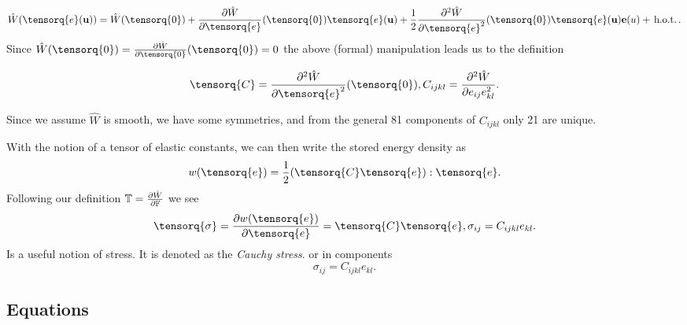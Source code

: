 \documentclass[reqno, a4paper]{article}
\begin{document}
\[
	\hat{W}\qty(\tensorq{e}\qty(\vb{u}))= \hat{W}\qty(\tensorq{0})+ \pdv{\hat{W}}{\tensorq{e}}\qty(\tensorq{0})\tensorq{e}\qty(\vb{u})+\frac{1}{2}\pdv[2]{\hat{W}}{\tensorq{e}}\qty(\tensorq{0})\tensorq{e}\qty(\vb{u}) \vb{e}\qty(u) + \, \text{h.o.t.} \,.
\]
Since $\hat{W}\qty(\tensorq{0}) = \pdv{\hat{W}}{\tensorq{0}}\qty(\tensorq{0}) = 0$ the above (formal) manipulation leads us to the definition
\begin{definition}
	\[
		\tensorq{C} = \pdv[2]{\hat{W}}{\tensorq{e}}\qty(\tensorq{0}), C_{ijkl} = \pdv[2]{\hat{W}}{e_{ij}e_{kl}}.
	\]
\end{definition}
\begin{remark}
    Since we assume $\hat{W}$ is smooth, we have some symmetries, and from the general 81 components of $C_{ijkl}$ only 21 are unique.
\end{remark}

With the notion of a tensor of elastic constants, we can then write the stored energy density as
\[
	w\qty(\tensorq{e}) = \frac{1}{2}(\tensorq{C}\tensorq{e}):\tensorq{e}.
\]
Following our definition $\mathbb{T} = \pdv{\hat{W}}{\ensuremath{\mathbb{F}}}$ we see
\[
	\tensorq{\sigma} = \pdv{w\qty(\tensorq{e})}{\tensorq{e}} = \tensorq{C}\tensorq{e}, \sigma_{ij} = C_{ijkl}e_{kl}.
\]
Is a useful notion of stress. It is denoted as the \textit{Cauchy stress}.
or in components
\[
	\sigma_{ij}=C_{ijkl}e_{kl}.
\]

\subsection{Equations}
\label{sec:linel_equations}
\end{document}
